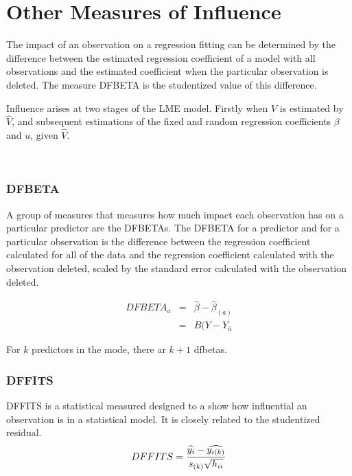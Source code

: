 \documentclass[residuals.tex]{subfiles}
\begin{document}
	
\section{Other Measures of Influence}
The impact of an observation on a regression fitting can be determined by the difference between the estimated regression coefficient of a model with all observations and the estimated coefficient when the particular observation is deleted. The measure DFBETA is the studentized value of this difference.

Influence arises at two stages of the LME model. Firstly when $V$ is estimated by $\hat{V}$, and subsequent
estimations of the fixed and random regression coefficients $\beta$ and $u$, given $\hat{V}$.

\

\subsubsection{DFBETA}
A group of measures that measures how much impact each observation has on a particular predictor are the DFBETAs. The DFBETA for a predictor and for a particular observation is the difference between the regression coefficient calculated for all of the data and the regression coefficient calculated with the observation deleted,  scaled by the standard error calculated with the observation deleted.

\begin{eqnarray}
DFBETA_{a} &=& \hat{\beta} - \hat{\beta}_{(a)} \\
&=& B(Y-Y_{\bar{a}}
\end{eqnarray}

For $k$ predictors in the mode, there ar $k+1$ dfbetas.



\subsubsection{DFFITS} %
DFFITS is a statistical measured designed to a show how influential an observation is in a statistical model. It is closely related to the studentized residual.
\begin{displaymath} DFFITS = {\widehat{y_i} -
	\widehat{y_{i(k)}} \over s_{(k)} \sqrt{h_{ii}}} \end{displaymath}
\end{document}
